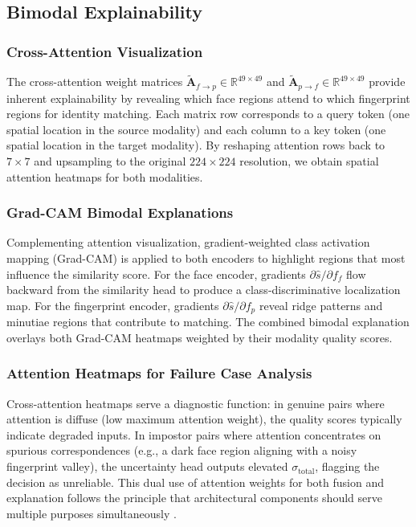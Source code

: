 \documentclass[10pt,journal,compsoc]{IEEEtran}
\begin{document}
\subsection{Bimodal Explainability}
\label{sec:explainability}

\subsubsection{Cross-Attention Visualization}

The cross-attention weight matrices $\tilde{\mathbf{A}}_{f \rightarrow p} \in \mathbb{R}^{49 \times 49}$ and $\tilde{\mathbf{A}}_{p \rightarrow f} \in \mathbb{R}^{49 \times 49}$ provide inherent explainability by revealing which face regions attend to which fingerprint regions for identity matching. Each matrix row corresponds to a query token (one spatial location in the source modality) and each column to a key token (one spatial location in the target modality). By reshaping attention rows back to $7 \times 7$ and upsampling to the original $224 \times 224$ resolution, we obtain spatial attention heatmaps for both modalities.

\subsubsection{Grad-CAM Bimodal Explanations}

Complementing attention visualization, gradient-weighted class activation mapping (Grad-CAM) \cite{selvaraju2017gradcam} is applied to both encoders to highlight regions that most influence the similarity score. For the face encoder, gradients $\partial \hat{s} / \partial f_f$ flow backward from the similarity head to produce a class-discriminative localization map. For the fingerprint encoder, gradients $\partial \hat{s} / \partial f_p$ reveal ridge patterns and minutiae regions that contribute to matching. The combined bimodal explanation overlays both Grad-CAM heatmaps weighted by their modality quality scores.

\subsubsection{Attention Heatmaps for Failure Case Analysis}

Cross-attention heatmaps serve a diagnostic function: in genuine pairs where attention is diffuse (low maximum attention weight), the quality scores typically indicate degraded inputs. In impostor pairs where attention concentrates on spurious correspondences (e.g., a dark face region aligning with a noisy fingerprint valley), the uncertainty head outputs elevated $\sigma_{\text{total}}$, flagging the decision as unreliable. This dual use of attention weights for both fusion and explanation follows the principle that architectural components should serve multiple purposes simultaneously \cite{gazi2026minutiae, lu2024towards}.
\end{document}
